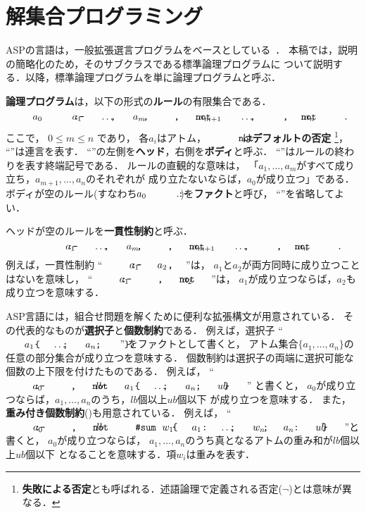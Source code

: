 ﻿\section{解集合プログラミング}\label{chap:asp}

ASPの言語は，一般拡張選言プログラムをベースとしている~\cite{Inoue08:jssst}．
本稿では，説明の簡略化のため，そのサブクラスである標準論理プログラムに
ついて説明する．以降，標準論理プログラムを単に論理プログラムと呼ぶ．

\textbf{論理プログラム}は，以下の形式の\textbf{ルール}の有限集合である．
\begin{equation}
 \label{eq:rule}\nonumber
  a_0 ~\mcode{:-}~ a_1 \mcode{,} \dots \mcode{,} a_m \mcode{,}~%
  \naf{a_{m+1}} \mcode{,} \dots \mcode{,} \naf{a_n}\mcode{.}
\end{equation}
ここで，
$0\leq m\leq n$ であり，
各$a_i$はアトム，
$\naf{}$は\textbf{デフォルトの否定}
\footnote{\textbf{失敗による否定}とも呼ばれる．述語論理で定義される否定($\neg$)とは意味が異なる．}，
``\mcode{,}''は連言を表す．
``\mcode{:-}''の左側を\textbf{ヘッド}，右側を\textbf{ボディ}と呼ぶ．
``''はルールの終わりを表す終端記号である．
ルールの直観的な意味は，
\!「\!$a_1,\ldots,a_m$がすべて成り立ち，$a_{m+1},\ldots,a_n$のそれぞれが
成り立たないならば，$a_0$が成り立つ」である．
ボディが空のルール(すなわち\(a_0~\mcode{:-}~.\))を\textbf{ファクト}と呼び，
``\mcode{:-}''を省略してよい．

ヘッドが空のルールを\textbf{一貫性制約}と呼ぶ．
\begin{equation}
  \label{eq:constr}\nonumber
  \mcode{:-}~ a_1 \mcode{,} \dots \mcode{,} a_m \mcode{,}~%
  \naf{a_{m+1}} \mcode{,} \dots \mcode{,} \naf{a_n}\mcode{.}
\end{equation}
例えば，一貫性制約
``\(\mcode{:-}~ a_1 \mcode{,} a_2 \mcode{.}\)''は，
$a_1$と$a_2$が両方同時に成り立つことはないを意味し，
``\(\mcode{:-}~ a_1 \mcode{,}~\naf{a_{2}} \mcode{.}\)''は，
$a_1$が成り立つならば，$a_2$も成り立つを意味する．

ASP言語には，組合せ問題を解くために便利な拡張構文が用意されている．
その代表的なものが\textbf{選択子}と\textbf{個数制約}である．
例えば，選択子
``\(\mcode{\{}a_1\mcode{;}\dots\mcode{;}a_n\mcode{\}.}\)''
をファクトとして書くと，
アトム集合\(\{a_1,\dots,a_n\}\)の任意の部分集合が成り立つを意味する．
個数制約は選択子の両端に選択可能な個数の上下限を付けたものである．
例えば，
``\(\mcode{:-}~a_{0}\mcode{,}~\naf{lb\ \mcode{\{}a_1\mcode{;}\dots\mcode{;}a_n\mcode{\}}\ ub\mcode{.}}\)''
と書くと，
$a_{0}$が成り立つならば，$a_1,\dots,a_n$のうち，$lb$個以上$ub$個以下
が成り立つを意味する．
また，\textbf{重み付き個数制約}()も用意されている．
例えば，
``\(\mcode{:-}~a_{0}\mcode{,}~\naf{lb\ \mcode{\#sum}~%
\mcode{\{}w_{1}\mcode{:}a_{1}\mcode{;} \dots \mcode{;}w_{n}\mcode{:}a_{n}\mcode{\}}\ ub}\mcode{.}\)''と書くと，
$a_{0}$が成り立つならば，
$a_1,\dots,a_n$のうち真となるアトムの重み和が$lb$個以上$ub$個以下
となることを意味する．項$w_{i}$は重みを表す．

